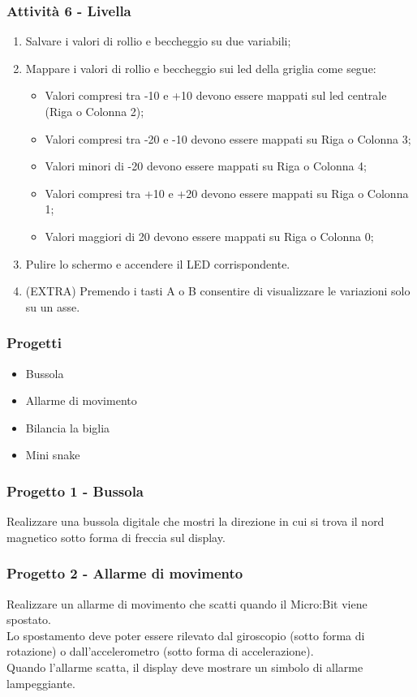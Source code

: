 \documentclass{beamer}
\begin{document}
\begin{frame}
	\frametitle{Attività 6 - Livella}

	\begin{enumerate}
		\item Salvare i valori di rollio e beccheggio su due variabili;
		\item Mappare i valori di rollio e beccheggio sui led della griglia come segue:
		\begin{itemize}
			\item Valori compresi tra -10 e +10 devono essere mappati sul led centrale (Riga o Colonna 2);
			\item Valori compresi tra -20 e -10 devono essere mappati su Riga o Colonna 3;
			\item Valori minori di -20 devono essere mappati su Riga o Colonna 4;
			\item Valori compresi tra +10 e +20 devono essere mappati su Riga o Colonna 1;
			\item Valori maggiori di 20 devono essere mappati su Riga o Colonna 0;
		\end{itemize}
		\item Pulire lo schermo e accendere il LED corrispondente.
		\item (EXTRA) Premendo i tasti A o B consentire di visualizzare le variazioni solo su un asse.
	\end{enumerate}

\end{frame}

\begin{frame}
	\frametitle{Progetti}

	\begin{itemize}
		\item Bussola
		\item Allarme di movimento
		\item Bilancia la biglia
		\item Mini snake
	\end{itemize}
	
\end{frame}

\begin{frame}
	\frametitle{Progetto 1 - Bussola}

	Realizzare una bussola digitale che mostri la direzione in cui si trova il nord magnetico sotto forma di freccia sul display.
	
\end{frame}

\begin{frame}
	\frametitle{Progetto 2 - Allarme di movimento}

	Realizzare un allarme di movimento che scatti quando il Micro:Bit viene spostato.\\
	Lo spostamento deve poter essere rilevato dal giroscopio (sotto forma di rotazione) o dall'accelerometro (sotto forma di accelerazione).\\
	Quando l'allarme scatta, il display deve mostrare un simbolo di allarme lampeggiante.

\end{frame}
\end{document}
